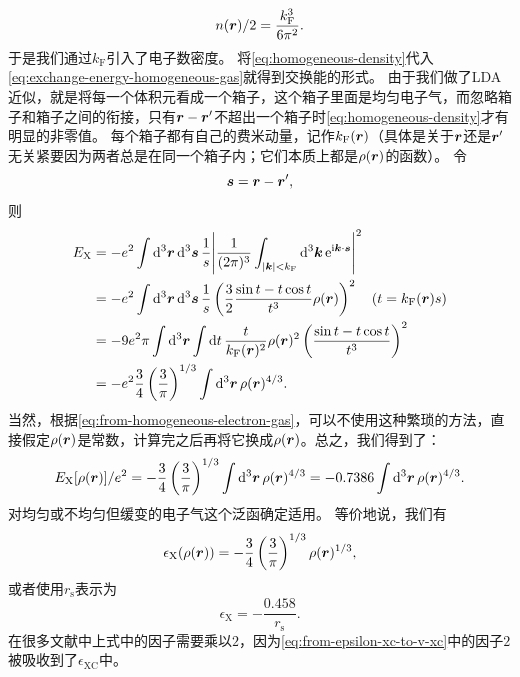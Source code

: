 \[
    n(\vb*{r}) / 2 = \frac{k_\text{F}^3}{6 \pi^2}.
\]
于是我们通过$k_\text{F}$引入了电子数密度。
将\eqref{eq:homogeneous-density}代入\eqref{eq:exchange-energy-homogeneous-gas}就得到交换能的形式。
由于我们做了LDA近似，就是将每一个体积元看成一个箱子，这个箱子里面是均匀电子气，而忽略箱子和箱子之间的衔接，只有$\vb*{r} - \vb*{r}'$不超出一个箱子时\eqref{eq:homogeneous-density}才有明显的非零值。
每个箱子都有自己的费米动量，记作$k_\text{F}(\vb*{r})$（具体是关于$\vb*{r}$还是$\vb*{r}'$无关紧要因为两者总是在同一个箱子内；它们本质上都是$\rho(\vb*{r})$的函数）。
令
\[
    \vb*{s} = \vb*{r} - \vb*{r}', 
\]
则
\[
    \begin{aligned}
        E_\text{X} &= - e^2 \int \dd[3]{\vb*{r}} \dd[3]{\vb*{s}} \frac{1}{s} \abs{\frac{1}{(2\pi)^3} \int_{\abs{\vb*{k}} < k_\text{F}} \dd[3]{\vb*{k}} \mathrm{e}^{\mathrm{i} \vb*{k} \cdot \vb*{s}}}^2 \\
        &= - e^2 \int \dd[3]{\vb*{r}} \dd[3]{\vb*{s}} \frac{1}{s} \left( \frac{3}{2} \frac{\sin t - t \cos t}{t^3} \rho(\vb*{r}) \right)^2 \quad (t= k_\text{F}(\vb*{r}) s) \\
        &= - 9 e^2 \pi \int \dd[3]{\vb*{r}} \int \dd{t} \frac{t}{k_\text{F}(\vb*{r})^2} \rho(\vb*{r})^2 \left( \frac{\sin t - t \cos t}{t^3} \right)^2 \\
        &= - e^2 \frac{3}{4} \left( \frac{3}{\pi} \right)^{1/3} \int \dd[3]{\vb*{r}} \rho(\vb*{r})^{4/3}.
    \end{aligned}
\]
当然，根据\eqref{eq:from-homogeneous-electron-gas}，可以不使用这种繁琐的方法，直接假定$\rho(\vb*{r})$是常数，计算完之后再将它换成$\rho(\vb*{r})$。总之，我们得到了：
\begin{equation}
    E_\text{X}[\rho(\vb*{r})] / e^2 = - \frac{3}{4} \left( \frac{3}{\pi} \right)^{1/3} \int \dd[3]{\vb*{r}} \rho(\vb*{r})^{4/3} = - 0.7386 \int \dd[3]{\vb*{r}} \rho(\vb*{r})^{4/3}.
    \label{eq:thomas-fermi-dirac-functional}
\end{equation}
对均匀或不均匀但缓变的电子气这个泛函确定适用。
等价地说，我们有
\begin{equation}
    \epsilon_\text{X}(\rho(\vb*{r})) = - \frac{3}{4} \left(\frac{3}{\pi}\right)^{1/3} \rho(\vb*{r})^{1/3},
\end{equation}
或者使用$r_\text{s}$表示为
\begin{equation}
    \epsilon_\text{X} = - \frac{0.458}{r_\text{s}}.
\end{equation}
在很多文献中上式中的因子需要乘以$2$，因为\eqref{eq:from-epsilon-xc-to-v-xc}中的因子$2$被吸收到了$\epsilon_\text{XC}$中。

